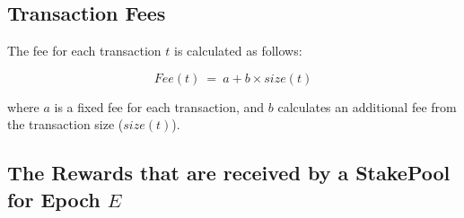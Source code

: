 \documentclass[11pt,a4paper,dvipsnames,twosided,final]{article}
\begin{document}
\subsection{Transaction Fees}
\label{sec:fees}

The fee for each transaction $t$ is calculated as follows:

$$
\textit{Fee} (t) ~=~ a + b \times \textit{size}(t)
$$

\noindent
where $a$ is a fixed fee for each transaction, and $b$ calculates an additional fee from the transaction size ($\textit{size}(t)$).

\clearpage
\subsection{The Rewards that are received by a StakePool for Epoch $E$}
\end{document}
